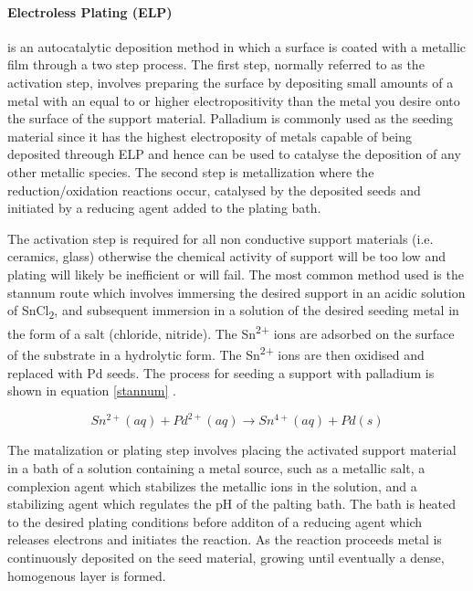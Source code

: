 \paragraph*{Electroless Plating (ELP)}\label{ELPREV} is an autocatalytic deposition method in which a surface is coated with a metallic film through a two step process. The first step, normally referred to as the activation step, involves preparing the surface by depositing small amounts of a metal with an equal to or higher electropositivity than the metal you desire onto the surface of the support material. Palladium is commonly used as the seeding material since it has the highest electroposity of metals capable of being deposited threough ELP and hence can be used to catalyse the deposition of any other metallic species. \cite{Exter2015}
The second step is metallization where the reduction/oxidation reactions occur, catalysed by the deposited seeds and initiated by a reducing agent added to the plating bath.

The activation step is required for all non conductive support materials (i.e. ceramics, glass) otherwise the chemical activity of support will be too low and plating will likely be inefficient or will fail. The most common method used is the stannum route which involves immersing the desired support in an acidic solution of SnCl\textsubscript{2}, and subsequent immersion in a solution of the desired seeding metal in the form of a salt (chloride, nitride). The Sn\textsuperscript{2+} ions are adsorbed on the surface of the substrate in a hydrolytic form. The Sn\textsuperscript{2+} ions are then oxidised and replaced with Pd seeds. \cite{Exter2015} The process for seeding a support with palladium is shown in equation \ref{stannum} \cite{Exter2015}.

\begin{equation} \label{stannum}
    Sn^{2+} (aq) + Pd^{2+} (aq) \rightarrow Sn^{4+} (aq) + Pd(s)
\end{equation}

The matalization or plating step involves placing the activated support material in a bath of a solution containing a metal source, such as a metallic salt, a complexion agent which stabilizes the metallic ions in the solution, and a stabilizing agent which regulates the pH of the palting bath. The bath is heated to the desired plating conditions before additon of a reducing agent which releases electrons and initiates the reaction. As the reaction proceeds metal is continuously deposited on the seed material, growing until eventually a dense, homogenous layer is formed. 

